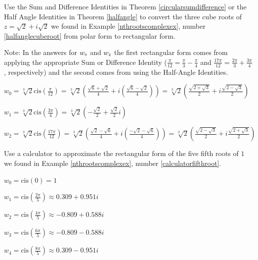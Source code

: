 \documentclass{ximera}
\begin{document}
\begin{problem}
Use the Sum and Difference Identities in Theorem \ref{circularsumdifference} or the Half Angle Identities in Theorem \ref{halfangle} to convert the three cube roots of $z=\sqrt{2} + i\sqrt{2}$ we found in  Example \ref{nthrootscomplexex}, number \ref{halfanglecuberoot} from polar form to rectangular form.

\begin{solution}

Note: In the answers for $w_{\text{\tiny$0$}}$ and $w_{\text{\tiny$2$}}$ the first rectangular form comes from applying the appropriate Sum or Difference Identity ($\frac{\pi}{12} = \frac{\pi}{3} - \frac{\pi}{4}$ and $\frac{17\pi}{12} = \frac{2\pi}{3} + \frac{3\pi}{4}$, respectively) and the second comes from using the Half-Angle Identities. 

$w_{0} = \sqrt[3]{2} \text{cis}\left(\frac{\pi}{12}\right) = \sqrt[3]{2}\left( \frac{\sqrt{6} + \sqrt{2}}{4} + i\left( \frac{\sqrt{6} - \sqrt{2}}{4} \right) \right) = \sqrt[3]{2}\left( \frac{\sqrt{2 + \sqrt{3}}}{2} + i\frac{\sqrt{2 - \sqrt{3}}}{2} \right)$ 
 
$w_{1} = \sqrt[3]{2} \text{cis}\left(\frac{3\pi}{4}\right) = \sqrt[3]{2} \left( -\frac{\sqrt{2}}{2} + \frac{\sqrt{2}}{2}i \right)$ 

$w_{2} = \sqrt[3]{2} \text{cis}\left(\frac{17\pi}{12}\right) = \sqrt[3]{2}\left( \frac{\sqrt{2} - \sqrt{6}}{4} + i\left( \frac{-\sqrt{2} - \sqrt{6}}{4} \right) \right) = \sqrt[3]{2}\left( \frac{\sqrt{2 - \sqrt{3}}}{2} + i\frac{\sqrt{2 + \sqrt{3}}}{2} \right)$

\end{solution}
\end{problem}

\begin{problem}
Use a calculator to approximate the rectangular form of the five fifth roots of $1$ we found in Example \ref{nthrootscomplexex}, number \ref{calculatorfifthroot}.

\begin{solution}

 $w_{0} = \text{cis}(0) = 1$

$w_{1} = \text{cis}\left(\frac{2\pi}{5}\right) \approx 0.309 + 0.951i$

$w_{2} = \text{cis}\left(\frac{4\pi}{5}\right) \approx -0.809 + 0.588i$

$w_{3} = \text{cis}\left(\frac{6\pi}{5}\right) \approx -0.809 - 0.588i$

$w_{4} = \text{cis}\left(\frac{8\pi}{5}\right) \approx 0.309 - 0.951i$

\end{solution}
\end{problem}
\end{document}
